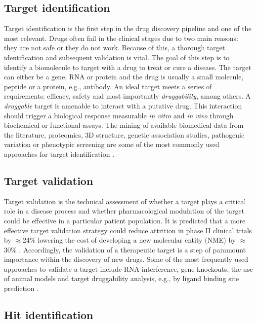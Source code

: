 \subsection{Target identification}

Target identification is the first step in the drug discovery pipeline and one of the most relevant. Drugs often fail in the clinical stages due to two main reasons: they are not safe or they do not work. Because of this, a thorough target identification and subsequent validation is vital. The goal of this step is to identify a biomolecule to target with a drug to treat or cure a disease. The target can either be a gene, RNA or protein and the drug is usually a small molecule, peptide or a protein, e.g., antibody. An ideal target meets a series of requirements: efficacy, safety and most importantly \textit{druggability}, among others. A \textit{druggable} target is amenable to interact with a putative drug. This interaction should trigger a biological response measurable \textit{in vitro} and \textit{in vivo} through biochemical or functional assays. The mining of available biomedical data from the literature, proteomics, 3D structure, genetic association studies, pathogenic variation or phenotypic screening are some of the most commonly used approaches for target identification \cite{SCHENONE_2013_TARGETID}.

\subsection{Target validation}

Target validation is the technical assessment of whether a target plays a critical role in a disease process and whether pharmacological modulation of the target could be effective in a particular patient population. It is predicted that a more effective target validation strategy could reduce attrition in phase II clinical trials by $\approx$24\% lowering the cost of developing a new molecular entity (NME) by $\approx$30\% \cite{PAUL_2010_RD}. Accordingly, the validation of a therapeutic target is a step of paramount importance within the discovery of new drugs. Some of the most frequently used approaches to validate a target include RNA interference, gene knockouts, the use of animal models and target druggability analysis, e.g., by ligand binding site prediction \cite{EMMERICH_2021_TARGET_VAL}.

\subsection{Hit identification}


